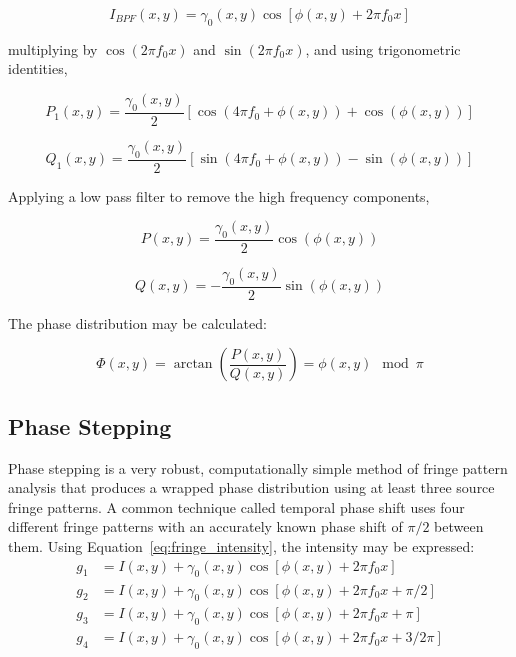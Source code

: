 \documentclass[11pt]{article} %
\begin{document}
\begin{equation}
	I_{BPF}(x,y) = \gamma_0(x,y)\cos[\phi(x,y) + 2 \pi f_0 x ]
	\label{eq:dpd1}
\end{equation}

multiplying by $\cos(2 \pi f_0 x)$ and $\sin(2 \pi f_0 x)$, and using trigonometric identities,

\begin{equation}
	P_1(x,y) = \frac{\gamma_0(x,y)}{2} \left [ \cos(4 \pi f_0 + \phi(x,y)) + \cos(\phi(x,y)) \right ]
	\label{eq:dpd2}
\end{equation}

\begin{equation}
	Q_1(x,y) = \frac{\gamma_0(x,y)}{2} \left [ \sin(4 \pi f_0 + \phi(x,y)) - \sin(\phi(x,y)) \right ]
	\label{eq:dpd3}
\end{equation}

Applying a low pass filter to remove the high frequency components,


\begin{equation}
	P(x,y) = \frac{\gamma_0(x,y)}{2} \cos(\phi(x,y))
	\label{eq:dpd4}
\end{equation}

\begin{equation}
	Q(x,y) =- \frac{\gamma_0(x,y)}{2}\sin(\phi(x,y))
	\label{eq:dpd5}
\end{equation}

The phase distribution may be calculated:

\begin{equation}
	\Phi(x,y) = \arctan \left ( \frac{P(x,y)}{Q(x,y)} \right ) = \phi(x,y) \mod \pi
	\label{eq:dpd6}
\end{equation}





\subsection{Phase Stepping}
Phase stepping is a very robust, computationally simple method of fringe pattern analysis that produces a wrapped phase distribution using at least three source fringe patterns. A common technique called temporal phase shift uses four different fringe patterns with an accurately known phase shift of $\pi/2$ between them. Using Equation~\ref{eq:fringe_intensity}, the intensity may be expressed:
\begin{equation}
	\begin{split}
	g_1 &= I(x,y) + \gamma_0(x,y) \cos[\phi(x,y) + 2 \pi f_0 x]\\
	g_2 & = I(x,y) + \gamma_0(x,y) \cos[\phi(x,y) + 2 \pi f_0 x + \pi/2]\\
	g_3 &= I(x,y) + \gamma_0(x,y) \cos[\phi(x,y) + 2 \pi f_0 x + \pi]\\
	g_4 &=I(x,y) + \gamma_0(x,y) \cos[\phi(x,y) + 2 \pi f_0 x + 3/2\pi]
	\end{split}
	\label{eq:psp}
\end{equation}
\end{document}
